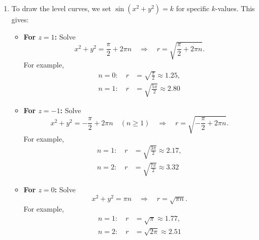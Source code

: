 \begin{example}
\begin{solution}
\begin{enumerate}
    \item To draw the level curves, we set \( \sin(x^2+y^2)=k \) for specific \( k \)-values. This gives:
    \begin{itemize}
        \item \textbf{For \( z=1 \):} Solve 
        \[
        x^2+y^2 = \frac{\pi}{2}+2\pi n \quad \Longrightarrow \quad r = \sqrt{\frac{\pi}{2}+2\pi n}.
        \]
        For example,
        \[
        \begin{aligned}
        n=0:\quad r &= \sqrt{\frac{\pi}{2}} \approx 1.25,\\[6pt]
        n=1:\quad r &= \sqrt{\frac{5\pi}{2}} \approx 2.80
        \end{aligned}
        \]
        
        \item \textbf{For \( z=-1 \):} Solve 
        \[
        x^2+y^2 = -\frac{\pi}{2}+2\pi n \quad (n \geq 1) \quad \Longrightarrow \quad r = \sqrt{-\frac{\pi}{2}+2\pi n}.
        \]
        For example,
        \[
        \begin{aligned}
        n=1:\quad r &= \sqrt{\frac{3\pi}{2}} \approx 2.17,\\[6pt]
        n=2:\quad r &= \sqrt{\frac{7\pi}{2}} \approx 3.32
        \end{aligned}
        \]
        
        \item \textbf{For \( z=0 \):} Solve 
        \[
        x^2+y^2 = \pi n \quad \Longrightarrow \quad r = \sqrt{\pi n}.
        \]
        For example,
        \[
        \begin{aligned}
        n=1:\quad r &= \sqrt{\pi} \approx 1.77,\\[6pt]
        n=2:\quad r &= \sqrt{2\pi} \approx 2.51
        \end{aligned}
        \]
    \end{itemize}

\begin{figure}[H]
    \centering
\end{figure}
\end{enumerate}
\end{solution}
\end{example}
